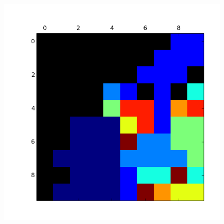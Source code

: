 \begin{figure}[h!]
\begin{minipage}{.15\textwidth}
  \label{fig:test2}
\end{minipage}
\begin{minipage}{.15\textwidth}
  \centering
  \includegraphics[width=.9\linewidth]{convergencia_kohonen/entrenamiento_100.png}
  \label{fig:test2}
\end{minipage}
\end{figure}